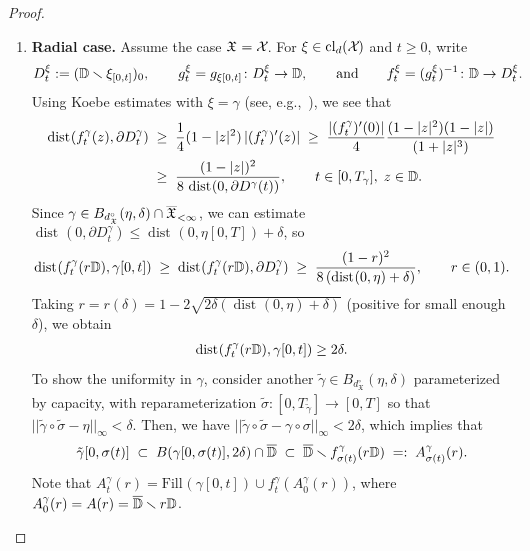 \documentclass[a4paper, 11pt]{article}
\theoremstyle{definition}
\numberwithin{equation}{section}
\numberwithin{figure}{section}
\newcommand{\filling}[2][]{\mathrm{Fill}_{#1}(#2)}
\newcommand{\Dpaths}[1][]{\cX_{#1}}
\newcommand{\Xpaths}[1][]{\mathfrak{X}_{#1}}
\newcommand{\Dpathscl}[1][]{\operatorname{cl}_{d}(\Dpaths[#1])}
\newcommand{\Xfinpathscl}{\overline{\Xpaths}_{<\infty}}
\newcommand{\Bmetric}[3][]{B_{#1}(#2,#3)}%
\newcommand{\norm}[1]{|\!|#1|\!|}
\newcommand{\normUniform}[1]{\norm{#1}_\infty}
\newcommand{\dXpathsUnparam}{d_{\Xpaths}^\circ}%
\renewcommand{\dist}[1][]{\operatorname{dist}_{#1}}
\begin{document}
\begin{proof}
\begin{enumerate}[leftmargin=*, label=\textnormal{(\roman*)}]
\item {\bf Radial case.}
Assume the case $\Xpaths = \Dpaths$. For $\xi \in \Dpathscl$ and $t \ge 0$, write
\begin{align*}
D^\xi_t := (\mathbb{D}\smallsetminus\xi_{[0,t]})_0, \qquad g^\xi_t = g_{\xi[0,t]} \colon D^\xi_t \to \mathbb{D}, \qquad \textnormal{and} \qquad f^\xi_t = (g^\xi_t)^{-1} \colon \mathbb{D} \to D^\xi_t.
\end{align*}
Using Koebe estimates with $\xi = \gamma$ 
(see, e.g.,~\cite[Theorem~1.3~\&~Corollary~1.4]{Pommerenke:Boundary_behaviour_of_conformal_maps}), 
we see that 
\begin{align*}
\dist(f^\gamma_t(z), \partial D^\gamma_t) 
\; \ge & \;\; \frac{1}{4}(1-|z|^2) \, |(f^\gamma_t)'(z)| 
\; \ge \; \frac{|(f^\gamma_t)'(0)|}{4}\frac{(1-|z|^2)(1-|z|)}{(1+|z|^3)} 
\\
\; \ge & \;\; \frac{(1-|z|)^2}{8\,\dist(0, \partial D^\gamma(t))} , \qquad t \in [0, T_\gamma] , \; z \in \bD .
\end{align*}
Since $\gamma \in \smash{\Bmetric[\dXpathsUnparam]{\eta}{\delta} \cap \Xfinpathscl}$, 
we can estimate $\dist(0,\partial D^\gamma_t) \le \dist(0, \eta[0,T]) + \delta$, so
\begin{align*}
\dist(f^\gamma_t(r\bD), \gamma[0,t]) 
\; \ge \; \dist(f^\gamma_t(r\bD), \partial D^\gamma_t) 
\; \ge \; \frac{(1-r)^2}{8\,(\dist(0,\eta) + \delta)} , \qquad r \in (0,1) .
\end{align*}
Taking $r = r(\delta) = 1 - 2\sqrt{2 \delta (\dist(0,\eta) + \delta)}$ (positive for small enough $\delta$), we obtain 
\begin{align*}
\dist(f^\gamma_t(r\bD), \gamma[0,t]) \ge 2\delta.
\end{align*} 
To show the uniformity in $\gamma$, 
consider another $\tilde\gamma \in \Bmetric[\dXpathsUnparam]{\eta}{\delta}$ parameterized by capacity, 
with reparameterization $\tilde \sigma \colon [0,T_{\tilde\gamma}] \to [0,T]$ so that $\normUniform{\tilde\gamma\circ\tilde\sigma - \eta} < \delta$. 
Then, we have $\normUniform{\tilde\gamma\circ\tilde\sigma - \gamma\circ\sigma} < 2\delta$, which implies that
\begin{align*}
\tilde\gamma[0,\sigma(t)] 
\; \subset \; \Bmetric{\gamma[0,\sigma(t)]}{2\delta} \cap \overline\bD 
\; \subset \; \overline\bD\smallsetminus f^\gamma_{\sigma(t)}(r\bD) 
\; =: \; A^\gamma_{\sigma(t)}(r).
\end{align*}
Note that $A^\gamma_t(r) = \filling{\gamma[0,t]}\cup f^\gamma_t(A^\gamma_0(r))$, where $A^\gamma_0(r) = A(r) = \overline{\mathbb{D}}\smallsetminus r\mathbb{D}$. 

\end{enumerate}
\end{proof}
\end{document}
